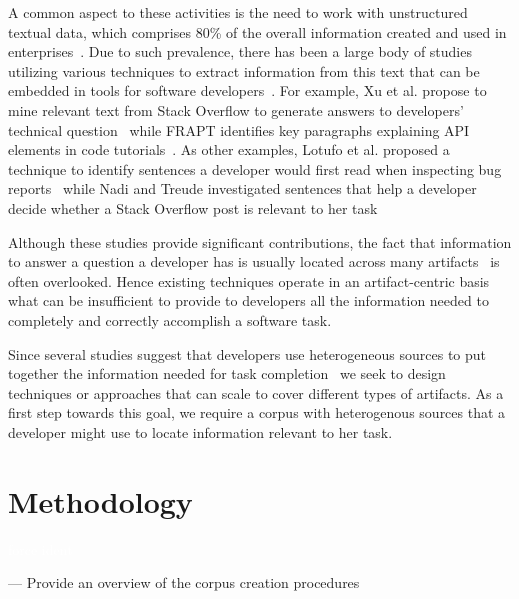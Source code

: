 A common aspect to these activities is the need to work with unstructured textual data, which comprises 80\% of the overall information created and used in enterprises~\cite{Bavota2014, holzinger2013}.
Due to such prevalence, there has been a large body of studies utilizing various techniques to extract
information from this text that can be embedded in
tools for software developers~\cite{Bavota2014, Xu2017, Robillard2015, Lotufo2012}. For example, Xu et al. propose to mine relevant text from Stack Overflow
to generate answers to developers' technical question~\cite{Xu2017}
while FRAPT identifies key paragraphs explaining API elements in code tutorials~\cite{Jiang2017}.
As other examples, Lotufo et al. proposed a technique to identify sentences a developer would first read when inspecting bug reports~\cite{Lotufo2012} while Nadi and Treude investigated sentences that help a developer decide whether a Stack Overflow post is relevant to her task~\cite{nadi2020}




Although these studies provide significant contributions, the fact that information to answer a question a developer has is usually located across many artifacts~\cite{Rastkar2013t} is often overlooked.
Hence existing techniques operate in an artifact-centric basis
what can be insufficient to provide to developers all the information needed 
to completely and correctly accomplish a software task.



Since several studies suggest that developers use heterogeneous sources to put together the information needed for task completion~\cite{josyula2018, Li2013, rao2020} we seek to design techniques or approaches that can scale to cover different types of artifacts.
As a first step towards this goal, we require a corpus with heterogenous sources that a developer 
might use to locate information relevant to her task.









\clearpage

\section{Methodology}
\textcolor{white}{force ident} %

--- Provide an overview of the corpus creation procedures 


